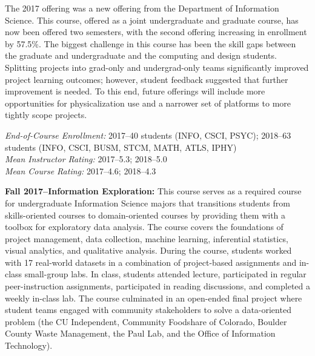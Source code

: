 \documentclass[11pt]{article}
\begin{document}
The 2017 offering was a new offering from the Department of Information Science. 
This course, offered as a joint undergraduate and graduate course, has now been offered two semesters, with the second offering increasing in enrollment by 57.5\%. The biggest challenge in this course has been the skill gaps between the graduate and undergraduate and the computing and design students. Splitting projects into grad-only and undergrad-only teams significantly improved project learning outcomes; however, student feedback suggested that further improvement is needed. To this end, future offerings will include more opportunities for physicalization use and a narrower set of platforms to more tightly scope projects.

\emph{End-of-Course Enrollment: }2017--40 students (INFO, CSCI, PSYC); 2018--63 students (INFO, CSCI, BUSM, STCM, MATH, ATLS, IPHY)\\
\emph{Mean Instructor Rating:} 2017--5.3; 2018--5.0\\
\emph{Mean Course Rating:} 2017--4.6; 2018--4.3

\textbf{Fall 2017--Information Exploration: } 
This course serves as a required course for undergraduate Information Science majors that transitions students from skills-oriented courses to domain-oriented courses by providing them with a toolbox for exploratory data analysis. The course covers the foundations of project management, data collection, machine learning, inferential statistics, visual analytics, and qualitative analysis. 
During the course, students worked with 17 real-world datasets in a combination of project-based assignments and in-class small-group labs. In class, students attended lecture, participated in regular peer-instruction assignments, participated in reading discussions, and completed a weekly in-class lab. The course culminated in an open-ended final project where student teams engaged with community stakeholders to solve a data-oriented problem (the CU Independent, Community Foodshare of Colorado, Boulder County Waste Management, the Paul Lab, and the Office of Information Technology). 
\end{document}
